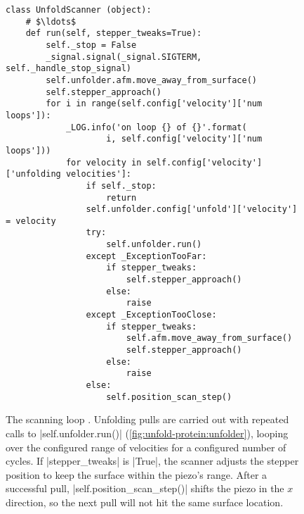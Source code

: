 \begin{figure}
  \begin{center}
\begin{verbatim}
class UnfoldScanner (object):
    # $\ldots$
    def run(self, stepper_tweaks=True):
        self._stop = False
        _signal.signal(_signal.SIGTERM, self._handle_stop_signal)
        self.unfolder.afm.move_away_from_surface()
        self.stepper_approach()
        for i in range(self.config['velocity']['num loops']):
            _LOG.info('on loop {} of {}'.format(
                    i, self.config['velocity']['num loops']))
            for velocity in self.config['velocity']['unfolding velocities']:
                if self._stop:
                    return
                self.unfolder.config['unfold']['velocity'] = velocity
                try:
                    self.unfolder.run()
                except _ExceptionTooFar:
                    if stepper_tweaks:
                        self.stepper_approach()
                    else:
                        raise
                except _ExceptionTooClose:
                    if stepper_tweaks:
                        self.afm.move_away_from_surface()
                        self.stepper_approach()
                    else:
                        raise
                else:
                    self.position_scan_step()
\end{verbatim}
    \caption{The scanning loop \unfoldprotein.  Unfolding pulls are
      carried out with repeated calls to
      |self.unfolder.run()|
      (\cref{fig:unfold-protein:unfolder}), looping over the
      configured range of velocities for a configured number of
      cycles.  If |stepper_tweaks| is
      |True|, the scanner adjusts the stepper position
      to keep the surface within the piezo's range.  After a
      successful pull, |self.position_scan_step()|
      shifts the piezo in the $x$ direction, so the next pull will not
      hit the same surface
      location.\label{fig:unfold-protein:scanner}}
  \end{center}
\end{figure}
